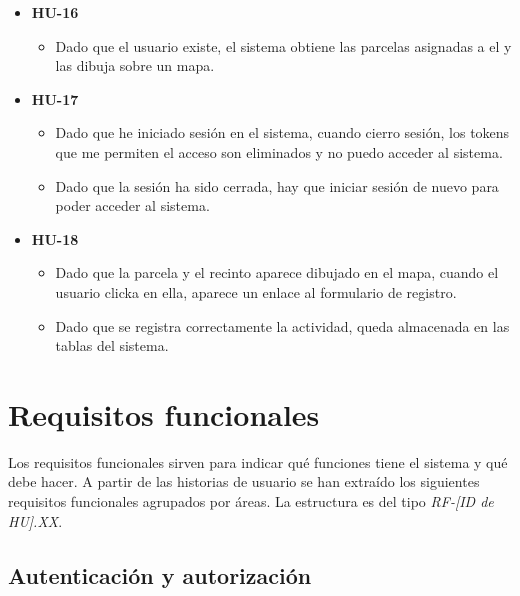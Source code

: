 \begin{itemize}
    \item \textbf{HU-16}
    \begin{itemize}
        \item Dado que el usuario existe, el sistema obtiene las parcelas asignadas a el y las dibuja 
        sobre un mapa.
    \end{itemize}
\end{itemize}

\begin{itemize}
    \item \textbf{HU-17}
    \begin{itemize}
        \item Dado que he iniciado sesión en el sistema, cuando cierro sesión, los tokens que me permiten
        el acceso son eliminados y no puedo acceder al sistema.
        \item Dado que la sesión ha sido cerrada, hay que iniciar sesión de nuevo para poder acceder al sistema.
    \end{itemize}
\end{itemize}

\begin{itemize}
    \item \textbf{HU-18}
    \begin{itemize}
        \item Dado que la parcela y el recinto aparece dibujado en el mapa, cuando el usuario clicka en ella,
        aparece un enlace al formulario de registro.
        \item Dado que se registra correctamente la actividad, queda almacenada en las tablas del sistema.
    \end{itemize}
\end{itemize}

\section{Requisitos funcionales}

Los requisitos funcionales sirven para indicar qué funciones tiene el sistema y qué debe hacer. A partir 
de las historias de usuario se han extraído los siguientes requisitos funcionales agrupados por áreas. 
La estructura es del tipo \textit{RF-[ID de HU].XX}.

\subsection{Autenticación y autorización}

